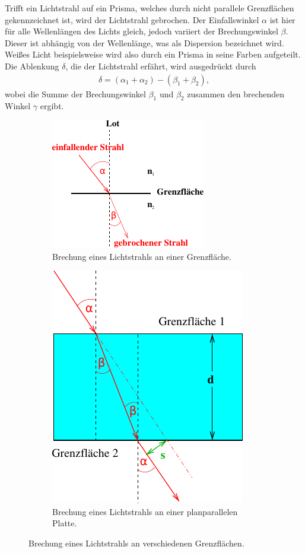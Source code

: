     Trifft ein Lichtstrahl auf ein Prisma, welches durch nicht parallele Grenzflächen gekennzeichnet ist, wird der Lichtstrahl gebrochen.
    Der Einfallswinkel $\alpha$ ist hier für alle Wellenlängen des Lichts gleich, jedoch variiert der Brechungswinkel $\beta$. Dieser
    ist abhängig von der Wellenlänge, was als Dispersion bezeichnet wird. Weißes Licht beispielsweise wird also durch ein Prisma in seine Farben aufgeteilt.
    Die Ablenkung $\delta$, die der Lichtstrahl erfährt, wird ausgedrückt durch
    \begin{align}
        \delta = (\alpha_1 + \alpha_2)- (\beta_1 + \beta_2),
        \label{eqn:Ablenkung}
    \end{align}
    wobei die Summe der Brechungswinkel $\beta_1$ und $\beta_2$ zusammen den brechenden Winkel $\gamma$ ergibt.
    \begin{figure}[H]
        \begin{subfigure}{0,56\textwidth}
        \centering
        \includegraphics{build/Abb_2b.pdf}
        \caption {Brechung eines Lichtstrahls an einer Grenzfläche.}
        \label{fig:Abb_2b}
        \end{subfigure}
        \hfill
        \begin{subfigure}{0,40\textwidth}
        \centering
        \includegraphics{build/Abb_5.pdf}
        \caption {Brechung eines Lichtstrahls an einer planparallelen Platte.}
        \label{fig:Abb_5}
        \end{subfigure}
        \caption{Brechung eines Lichtstrahls an verschiedenen Grenzflächen\cite[2]{V400}.}
    \end{figure}


